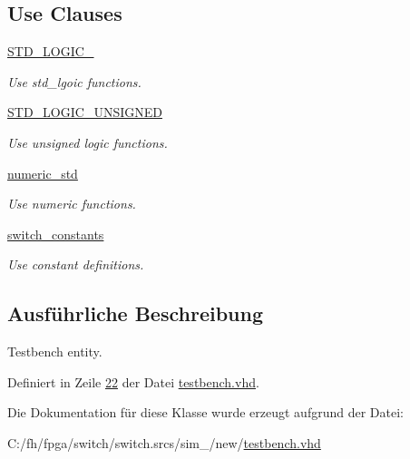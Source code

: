 \subsection*{Use Clauses}
 \begin{DoxyCompactItemize}
\item 
\mbox{\label{classtestbench_aa4b2b25246a821511120e3149b003563}} 
\mbox{\hyperlink{classtestbench_aa4b2b25246a821511120e3149b003563}{S\+T\+D\+\_\+\+L\+O\+G\+I\+C\+\_}}   
\begin{DoxyCompactList}\small\item\em Use std\+\_\+lgoic functions. \end{DoxyCompactList}\item 
\mbox{\label{classtestbench_a241c3e72dd8024cc8ae831b1b2aed7db}} 
\mbox{\hyperlink{classtestbench_a241c3e72dd8024cc8ae831b1b2aed7db}{S\+T\+D\+\_\+\+L\+O\+G\+I\+C\+\_\+\+U\+N\+S\+I\+G\+N\+ED}}   
\begin{DoxyCompactList}\small\item\em Use unsigned logic functions. \end{DoxyCompactList}\item 
\mbox{\label{classtestbench_a2edc34402b573437d5f25fa90ba4013e}} 
\mbox{\hyperlink{classtestbench_a2edc34402b573437d5f25fa90ba4013e}{numeric\+\_\+std}}   
\begin{DoxyCompactList}\small\item\em Use numeric functions. \end{DoxyCompactList}\item 
\mbox{\label{classtestbench_a46ad374fc1935ff761f9c11bad3a0719}} 
\mbox{\hyperlink{classtestbench_a46ad374fc1935ff761f9c11bad3a0719}{switch\+\_\+constants}}   
\begin{DoxyCompactList}\small\item\em Use constant definitions. \end{DoxyCompactList}\end{DoxyCompactItemize}


\subsection{Ausführliche Beschreibung}
Testbench entity. 

Definiert in Zeile \mbox{\hyperlink{testbench_8vhd_source_l00022}{22}} der Datei \mbox{\hyperlink{testbench_8vhd_source}{testbench.\+vhd}}.



Die Dokumentation für diese Klasse wurde erzeugt aufgrund der Datei\+:\begin{DoxyCompactItemize}
\item 
C\+:/fh/fpga/switch/switch.\+srcs/sim\+\_/new/\mbox{\hyperlink{testbench_8vhd}{testbench.\+vhd}}\end{DoxyCompactItemize}
